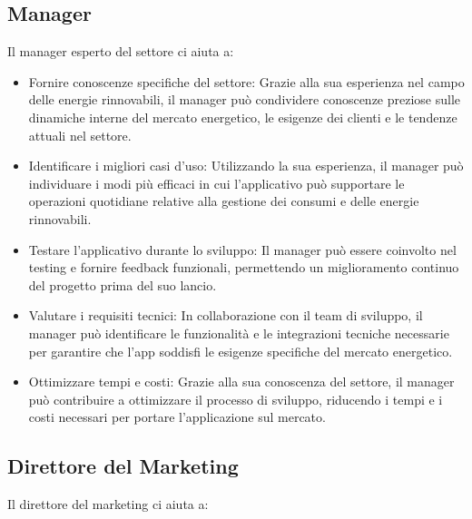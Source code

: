 \documentclass[oneside]{book}
\begin{document}
\subsection{Manager}
Il manager esperto del settore ci aiuta a:
\begin{itemize}
    \item Fornire conoscenze specifiche del settore: Grazie alla sua esperienza nel campo delle energie rinnovabili, il manager può condividere conoscenze preziose sulle dinamiche interne del mercato energetico, le esigenze dei clienti e le tendenze attuali nel settore.
    \item Identificare i migliori casi d'uso: Utilizzando la sua esperienza, il manager può individuare i modi più efficaci in cui l'applicativo può supportare le operazioni quotidiane relative alla gestione dei consumi e delle energie rinnovabili.
    \item Testare l'applicativo durante lo sviluppo: Il manager può essere coinvolto nel testing e fornire feedback funzionali, permettendo un miglioramento continuo del progetto prima del suo lancio.
    \item Valutare i requisiti tecnici: In collaborazione con il team di sviluppo, il manager può identificare le funzionalità e le integrazioni tecniche necessarie per garantire che l'app soddisfi le esigenze specifiche del mercato energetico.
    \item Ottimizzare tempi e costi: Grazie alla sua conoscenza del settore, il manager può contribuire a ottimizzare il processo di sviluppo, riducendo i tempi e i costi necessari per portare l'applicazione sul mercato.
\end{itemize}

\subsection{Direttore del Marketing}

Il direttore del marketing ci aiuta a:
\end{document}
